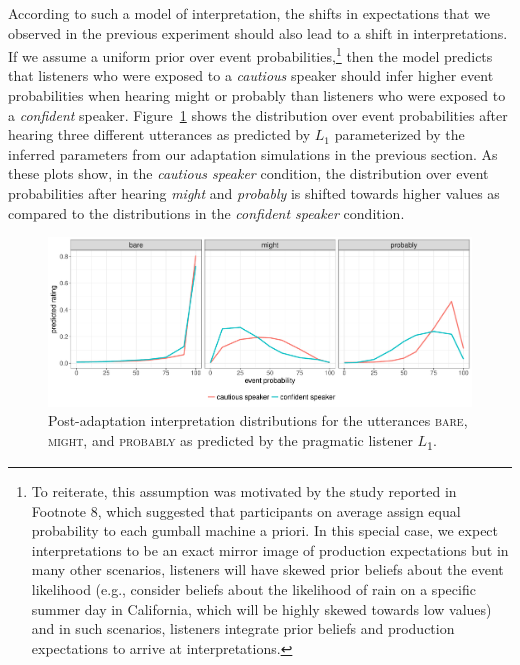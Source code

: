 \documentclass[man, floatsintext]{apa6}
\begin{document}
According to such a model of interpretation, the shifts in expectations that we observed in the previous experiment should also lead to a shift in interpretations. 
If we assume a uniform prior over event probabilities,\footnote{To reiterate, this assumption was motivated by the study reported in Footnote 8, which suggested that participants on average assign equal probability to each gumball machine a priori. In this special case, we expect interpretations to be an exact mirror image of production expectations but in many other scenarios, listeners will have skewed prior beliefs about the event likelihood (e.g., consider beliefs about the likelihood of rain on a specific summer day in California, which will be highly skewed towards low values) and in such scenarios, listeners integrate prior beliefs and  production expectations to arrive at interpretations.} then the model predicts that listeners who were exposed to a \textit{cautious} speaker should infer 
higher event probabilities when hearing {\sc might} or {\sc probably} than listeners who were exposed to a \textit{confident} speaker. Figure~\ref{fig:post-exposure-comp}
shows the distribution over event probabilities after hearing three different utterances as predicted by $L_1$ parameterized by the inferred parameters from our
adaptation simulations in the previous section. As these plots show, in the \textit{cautious speaker} condition, the distribution over event probabilities after hearing \textit{might} 
and \textit{probably} is shifted towards higher values as compared to the distributions in the \textit{confident speaker} condition. 

\begin{figure}
  \includegraphics[width=\textwidth]{plots/adaptation-posterior-comp.pdf}
  \caption{Post-adaptation interpretation distributions for the utterances  \textsc{bare}, \textsc{might}, and \textsc{probably} as predicted by the pragmatic listener $L$\textsubscript{$1$}. \label{fig:post-exposure-comp}}
\end{figure}
\end{document}
